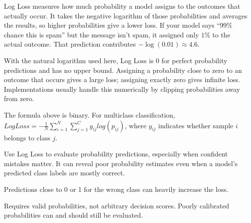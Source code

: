 \metricend
\clearpage
\thispagestyle{classificationstyle}
\label{sec:log-loss}

Log Loss measures how much probability a model assigns to the outcomes that actually occur. It takes the negative logarithm of those probabilities and averages the results, so higher probabilities give a lower loss. If your model says ``$99\%$ chance this is spam'' but the message isn't spam, it assigned only $1\%$ to the actual outcome. That prediction contributes $-\log(0.01) \approx 4.6$.

\begin{metricformula}
\end{metricformula}

With the natural logarithm used here, Log Loss is $0$ for perfect probability predictions and has no upper bound. Assigning a probability close to zero to an outcome that occurs gives a large loss; assigning exactly zero gives infinite loss. Implementations usually handle this numerically by clipping probabilities away from zero.

The formula above is binary. For multiclass classification, $Log Loss = -\frac{1}{N} \sum_{i=1}^{N} \sum_{j=1}^{C} y_{ij} log(p_{ij})$, where $y_{ij}$ indicates whether sample $i$ belongs to class $j$.


Use Log Loss to evaluate probability predictions, especially when confident mistakes matter. It can reveal poor probability estimates even when a model's predicted class labels are mostly correct.

{
    \item Predictions close to 0 or 1 for the wrong class can heavily increase the loss.
    \item Requires valid probabilities, not arbitrary decision scores. Poorly calibrated probabilities can and should still be evaluated.
}

